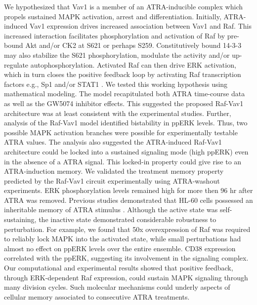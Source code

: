 \documentclass[12pt]{article}
\begin{document}
We hypothesized that Vav1 is a member of an ATRA-inducible complex which propels sustained MAPK activation, arrest and differentiation.
Initially, ATRA-induced Vav1 expression drives increased association between Vav1 and Raf.
This increased interaction facilitates phosphorylation and activation of Raf by pre-bound Akt and/or CK2 at S621 or perhaps S259.
Constitutively bound 14-3-3 may also stabilize the S621 phosphorylation, modulate the activity and/or up-regulate autophosphorylation.
Activated Raf can then drive ERK activation, which in turn closes the positive feedback loop by activating Raf transcription factors
e.g., Sp1 and/or STAT1 \cite{Kim2009,Milanini-Mongiat2002,Zhang2004,Li2006}.
We tested this working hypothesis using mathematical modeling.
The model recapitulated both ATRA time-course data as well as the GW5074 inhibitor effects.
This suggested the proposed Raf-Vav1 architecture was at least consistent with the experimental studies.
Further, analysis of the Raf-Vav1 model identified bistability in ppERK levels.
Thus, two possible MAPK activation branches were possible for experimentally testable ATRA values. The analysis also suggested the ATRA-induced Raf-Vav1 architecture could be locked into a
sustained signaling mode (high ppERK) even in the absence of a ATRA signal.
This locked-in property could give rise to an ATRA-induction memory.
We validated the treatment memory property predicted by the Raf-Vav1 circuit experimentally using ATRA-washout experiments.
ERK phosphorylation levels remained high for more then 96 hr after ATRA was removed.
Previous studies demonstrated that HL-60 cells possessed an inheritable memory of ATRA stimulus \cite{YEN1984}.
Although the active state was self-sustaining, the inactive state demonstrated considerable robustness to perturbation.
For example, we found that 50x overexpression of Raf was required to reliably lock MAPK into the activated state, while small perturbations had almost no effect on ppERK levels
over the entire ensemble.
CD38 expression correlated with the ppERK, suggesting its involvement in the signaling complex.
Our computational and experimental results showed that positive feedback,
through ERK-dependent Raf expression, could sustain MAPK signaling through many division cycles.
Such molecular mechanisms could underly aspects of cellular memory associated to consecutive ATRA treatments.
\end{document}
